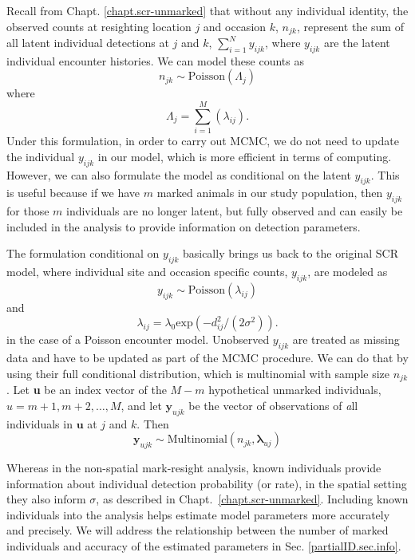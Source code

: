 Recall from Chapt. \ref{chapt.scr-unmarked} that without any
individual identity, the observed counts at resighting location $j$
and occasion $k$, $n_{jk}$, represent the sum of all latent individual
detections at $j$ and $k$, $\displaystyle\sum\limits_{i=1}^{N}
y_{ijk}$, where $y_{ijk}$ are the latent individual encounter
histories.  We can model these counts as
\[
n_{jk} \sim \mbox{Poisson}( \Lambda_{j} )
\]
where
\[
\Lambda_{j} = \sum_{i=1}^{M}( \lambda_{ij} ).
\]
Under this formulation, in order to carry out MCMC, we do not need to
update the individual $y_{ijk}$ in our model, which is more efficient
in terms of computing. However, we can also formulate the model as
conditional on the latent $y_{ijk}$. This is useful because if we have
$m$ marked animals in our study population, then $y_{ijk}$ for those
$m$ individuals are no longer latent, but fully observed and can
easily be included in the analysis to provide information on detection
parameters.

The formulation conditional on $y_{ijk}$ basically brings us back to
the original SCR model, where individual site and occasion specific
counts, $y_{ijk}$, are modeled as
\[
y_{ijk} \sim \mbox{Poisson}(\lambda_{ij})
\]
and
\[
\lambda_{ij} = \lambda_0  \mbox{exp}(-d_{ij}^2/(2 \sigma^2)).
\]
in the case of a Poisson encounter model.
Unobserved $y_{ijk}$ are treated as missing data and have to be
updated as part of the MCMC procedure. We can do that by using their
full conditional distribution, which is multinomial with sample size
$n_{jk}$.
Let \textbf{u} be an index vector of the $M-m$ hypothetical
unmarked individuals, $u=m+1, m+2, \ldots, M$, and let $\mathbf{y}_{ujk}$ be the vector of observations of {\emph all} individuals in $\mathbf{u}$ at $j$ and $k$. Then
\[
\mathbf{y}_{ujk} \sim \mbox{Multinomial} (n_{jk}, \mathbf{\lambda}_{uj})
\]

Whereas in the non-spatial mark-resight analysis, known individuals
provide information about individual detection probability (or rate),
in the spatial setting they also inform $\sigma$, as described in
Chapt.~\ref{chapt.scr-unmarked}. Including known individuals into the
analysis helps estimate model parameters more accurately and
precisely. We will address the relationship between the number of
marked individuals and accuracy of the estimated parameters in
Sec. \ref{partialID.sec.info}.


